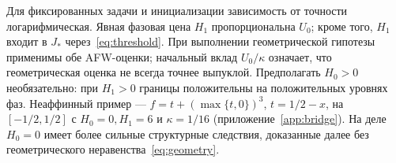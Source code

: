 Для фиксированных задачи и инициализации зависимость от точности
логарифмическая. Явная фазовая цена $H_1$ пропорциональна $U_0$;
кроме того, $H_1$ входит в $J_*$ через~\eqref{eq:threshold}.
При выполнении геометрической гипотезы применимы обе AFW-оценки;
начальный вклад $U_0/\kappa$ означает, что геометрическая оценка
не всегда точнее выпуклой. Предполагать $H_0>0$ необязательно:
при $H_1>0$ границы положительны на положительных уровнях фаз.
Неаффинный пример — $f=t+(\max\{t,0\})^3$, $t=1/2-x$, на
$[-1/2,1/2]$ с $H_0=0,H_1=6$ и $\kappa=1/16$
(приложение~\ref{app:bridge}). На деле $H_0=0$ имеет более сильные
структурные следствия, доказанные далее без геометрического
неравенства~\eqref{eq:geometry}.
